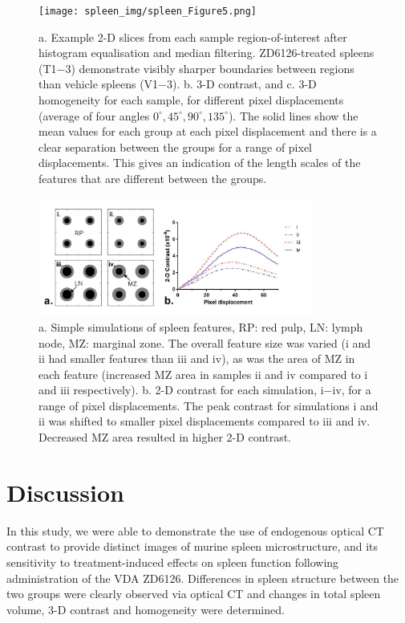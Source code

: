 	\begin{figure}%
		\centering
		\texttt{[image: spleen\_img/spleen\_Figure5.png]}
		\caption{a. Example 2-D slices from each sample region-of-interest after histogram equalisation and median filtering. ZD6126-treated spleens (T1−3) demonstrate visibly sharper boundaries between regions than vehicle spleens (V1−3). b. 3-D contrast, and c. 3-D homogeneity for each sample, for different pixel displacements (average of four angles $0^{\circ}, 45^{\circ}, 90^{\circ}, 135^{\circ}$). The solid lines show the mean values for each group at each pixel displacement and there is a clear separation between the groups for a range of pixel displacements. This gives an indication of the length scales of the features that are different between the groups.}
		\label{fig:5}
	\end{figure}
	
	\begin{figure}%
		\centering
		\includegraphics[width=0.8\textwidth]{spleen_img/spleen_Figure6.jpg}
		\caption{a. Simple simulations of spleen features, RP: red pulp, LN: lymph node, MZ: marginal zone. The overall feature size was varied (i and ii had smaller features than iii and iv), as was the area of MZ in each feature (increased MZ area in samples ii and iv compared to i and iii respectively). b. 2-D contrast for each simulation, i−iv, for a range of pixel displacements. The peak contrast for simulations i and ii was shifted to smaller pixel displacements compared to iii and iv. Decreased MZ area resulted in higher 2-D contrast.}
		\label{fig:6}
	\end{figure}
	
	
	
	\section{Discussion}
	In this study, we were able to demonstrate the use of endogenous optical CT contrast to provide distinct images of murine spleen microstructure, and its sensitivity to treatment-induced effects on spleen function following administration of the VDA ZD6126. Differences in spleen structure between the two groups were clearly observed via optical CT and changes in total spleen volume, 3-D contrast and homogeneity were determined.
	
